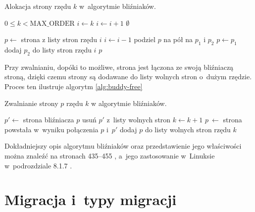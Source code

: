 \begin{algorithm}
\caption[Alokacja strony w~algorytmie bliźniaków.]{Alokacja strony
  rzędu $k$ w~algorytmie bliźniaków.}
\label{alg:buddy-alloc}
\begin{algorithmic}[1]
\Require $0 \leq k < \mathrm{MAX\_ORDER}$
    \State $i \gets k$
        \State $i \gets i + 1$
            \State \Return $\emptyset$
        \EndIf
    \EndWhile

    \State $p \gets$ strona z listy stron rzędu $i$
        \State $i \gets i - 1$
        \State podziel $p$ na pół na $p_1$ i $p_2$
        \State $p \gets p_1$
        \State dodaj $p_2$ do listy stron rzędu $i$
    \EndWhile
    \State \Return $p$
\EndFunction
\end{algorithmic}
\end{algorithm}

Przy zwalnianiu, dopóki to możliwe, strona jest łączona ze swoją
bliźniaczą stroną, dzięki czemu strony są dodawane do listy wolnych
stron o~dużym rzędzie.  Proces ten ilustruje algorytm
\ref{alg:buddy-free}

\begin{algorithm}
\caption[Zwalnianie strony w~algorytmie bliźniaków.]{Zwalnianie strony
  $p$ rzędu $k$ w algorytmie bliźniaków.}
\label{alg:buddy-free}
\begin{algorithmic}[1]
        \State $p' \gets$ strona bliźniacza $p$
        \State usuń $p'$ z~listy wolnych stron
        \State $k \gets k + 1$
        \State $p~\gets$ strona powstała w~wyniku połączenia $p$ i~$p'$ \label{alg:buddy-free:join}
    \EndWhile
    \State dodaj $p$ do listy wolnych stron rzędu $k$ \label{alg:buddy-free:add}
\EndProcedure
\end{algorithmic}
\end{algorithm}

Dokładniejszy opis algorytmu bliźniaków oraz przedstawienie jego
właściwości można znaleźć na stronach 435--455
\autocite{bib:taocp-fa}, a~jego zastosowanie w~Linuksie w~podrozdziale
8.1.7 \autocite{bib:utlk}.


\section{Migracja i~typy migracji}\label{sec:migratetype}

